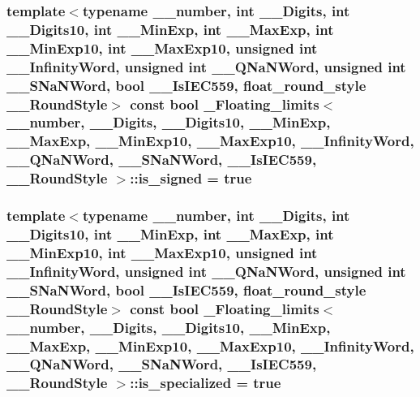 \subsubsection[{is\+\_\+signed}]{\setlength{\rightskip}{0pt plus 5cm}template$<$typename \+\_\+\+\_\+number, int \+\_\+\+\_\+\+Digits, int \+\_\+\+\_\+\+Digits10, int \+\_\+\+\_\+\+Min\+Exp, int \+\_\+\+\_\+\+Max\+Exp, int \+\_\+\+\_\+\+Min\+Exp10, int \+\_\+\+\_\+\+Max\+Exp10, unsigned int \+\_\+\+\_\+\+Infinity\+Word, unsigned int \+\_\+\+\_\+\+Q\+Na\+N\+Word, unsigned int \+\_\+\+\_\+\+S\+Na\+N\+Word, bool \+\_\+\+\_\+\+Is\+I\+E\+C559, float\+\_\+round\+\_\+style \+\_\+\+\_\+\+Round\+Style$>$ const {\bf bool} {\bf \+\_\+\+Floating\+\_\+limits}$<$ \+\_\+\+\_\+number, \+\_\+\+\_\+\+Digits, \+\_\+\+\_\+\+Digits10, \+\_\+\+\_\+\+Min\+Exp, \+\_\+\+\_\+\+Max\+Exp, \+\_\+\+\_\+\+Min\+Exp10, \+\_\+\+\_\+\+Max\+Exp10, \+\_\+\+\_\+\+Infinity\+Word, \+\_\+\+\_\+\+Q\+Na\+N\+Word, \+\_\+\+\_\+\+S\+Na\+N\+Word, \+\_\+\+\_\+\+Is\+I\+E\+C559, \+\_\+\+\_\+\+Round\+Style $>$\+::is\+\_\+signed = {\bf true}\hspace{0.3cm}{\ttfamily [static]}}\label{class__Floating__limits_a1e78ab62e60c0d9faef1d3df89da9682}
\hypertarget{class__Floating__limits_a7bf69463b667974854ae941799ec2848}{}
\subsubsection[{is\+\_\+specialized}]{\setlength{\rightskip}{0pt plus 5cm}template$<$typename \+\_\+\+\_\+number, int \+\_\+\+\_\+\+Digits, int \+\_\+\+\_\+\+Digits10, int \+\_\+\+\_\+\+Min\+Exp, int \+\_\+\+\_\+\+Max\+Exp, int \+\_\+\+\_\+\+Min\+Exp10, int \+\_\+\+\_\+\+Max\+Exp10, unsigned int \+\_\+\+\_\+\+Infinity\+Word, unsigned int \+\_\+\+\_\+\+Q\+Na\+N\+Word, unsigned int \+\_\+\+\_\+\+S\+Na\+N\+Word, bool \+\_\+\+\_\+\+Is\+I\+E\+C559, float\+\_\+round\+\_\+style \+\_\+\+\_\+\+Round\+Style$>$ const {\bf bool} {\bf \+\_\+\+Floating\+\_\+limits}$<$ \+\_\+\+\_\+number, \+\_\+\+\_\+\+Digits, \+\_\+\+\_\+\+Digits10, \+\_\+\+\_\+\+Min\+Exp, \+\_\+\+\_\+\+Max\+Exp, \+\_\+\+\_\+\+Min\+Exp10, \+\_\+\+\_\+\+Max\+Exp10, \+\_\+\+\_\+\+Infinity\+Word, \+\_\+\+\_\+\+Q\+Na\+N\+Word, \+\_\+\+\_\+\+S\+Na\+N\+Word, \+\_\+\+\_\+\+Is\+I\+E\+C559, \+\_\+\+\_\+\+Round\+Style $>$\+::is\+\_\+specialized = {\bf true}\hspace{0.3cm}{\ttfamily [static]}}\label{class__Floating__limits_a7bf69463b667974854ae941799ec2848}
\hypertarget{class__Floating__limits_a255ad0aea1d240e3f78d370b76984e2a}{}
